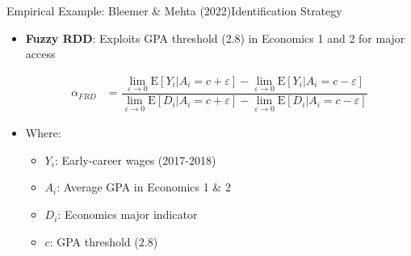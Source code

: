 \documentclass[hyperref={pdfpagelabels=false}]{beamer}
\begin{document}
\begin{frame}{Empirical Example: Bleemer \& Mehta (2022)}{Identification Strategy}
	\begin{itemize}
		\item \textbf{Fuzzy RDD}: Exploits GPA threshold (2.8) in Economics 1 and 2 for major access
		
		\vspace{0.2cm}
		\begin{equation*}
			\begin{aligned}
				\alpha_{FRD} &=\dfrac{\lim_{\varepsilon\rightarrow 0}\mathrm{E}[Y_{i}|A_{i}=c+\varepsilon]-\lim_{\varepsilon\rightarrow 0}\mathrm{E}[Y_{i}|A_{i}=c-\varepsilon]}{\lim_{\varepsilon\rightarrow 0}\mathrm{E}[D_{i}|A_{i}=c+\varepsilon]-\lim_{\varepsilon\rightarrow 0}\mathrm{E}[D_{i}|A_{i}=c-\varepsilon]} 
			\end{aligned}
		\end{equation*} 
		
		\item Where:
		\begin{itemize}
					\vspace{0.2cm}
			\item $Y_i$: Early-career wages (2017-2018)
					\vspace{0.2cm}
			\item $A_i$: Average GPA in Economics 1 \& 2
					\vspace{0.2cm}
			\item $D_i$: Economics major indicator
					\vspace{0.2cm}
			\item $c$: GPA threshold (2.8)
		\end{itemize}
	\end{itemize}
\end{frame}
\end{document}
